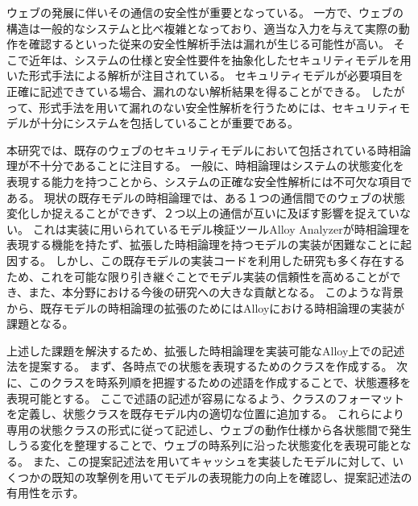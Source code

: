\documentclass[12pt,a4paper]{jbook}
\begin{document}
ウェブの発展に伴いその通信の安全性が重要となっている。
一方で、ウェブの構造は一般的なシステムと比べ複雑となっており、適当な入力を与えて実際の動作を確認するといった従来の安全性解析手法は漏れが生じる可能性が高い。
そこで近年は、システムの仕様と安全性要件を抽象化したセキュリティモデルを用いた形式手法による解析が注目されている。
セキュリティモデルが必要項目を正確に記述できている場合、漏れのない解析結果を得ることができる。
したがって、形式手法を用いて漏れのない安全性解析を行うためには、セキュリティモデルが十分にシステムを包括していることが重要である。

本研究では、既存のウェブのセキュリティモデルにおいて包括されている時相論理が不十分であることに注目する。
一般に、時相論理はシステムの状態変化を表現する能力を持つことから、システムの正確な安全性解析には不可欠な項目である。
現状の既存モデルの時相論理では、ある１つの通信間でのウェブの状態変化しか捉えることができず、２つ以上の通信が互いに及ぼす影響を捉えていない。
これは実装に用いられているモデル検証ツールAlloy Analyzerが時相論理を表現する機能を持たず、拡張した時相論理を持つモデルの実装が困難なことに起因する。
しかし、この既存モデルの実装コードを利用した研究も多く存在するため、これを可能な限り引き継ぐことでモデル実装の信頼性を高めることができ、また、本分野における今後の研究への大きな貢献となる。
このような背景から、既存モデルの時相論理の拡張のためにはAlloyにおける時相論理の実装が課題となる。

上述した課題を解決するため、拡張した時相論理を実装可能なAlloy上での記述法を提案する。
まず、各時点での状態を表現するためのクラスを作成する。
次に、このクラスを時系列順を把握するための述語を作成することで、状態遷移を表現可能とする。
ここで述語の記述が容易になるよう、クラスのフォーマットを定義し、状態クラスを既存モデル内の適切な位置に追加する。
これらにより専用の状態クラスの形式に従って記述し、ウェブの動作仕様から各状態間で発生しうる変化を整理することで、ウェブの時系列に沿った状態変化を表現可能となる。
また、この提案記述法を用いてキャッシュを実装したモデルに対して、いくつかの既知の攻撃例を用いてモデルの表現能力の向上を確認し、提案記述法の有用性を示す。
\end{document}
